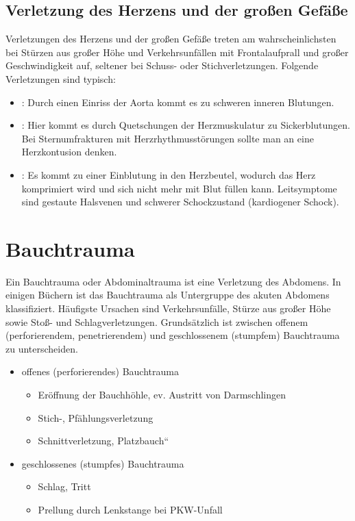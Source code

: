 \subsection{Verletzung des Herzens und der großen Gefäße}
Verletzungen des Herzens und der großen Gefäße treten am wahrscheinlichsten bei Stürzen aus großer Höhe und Verkehrsunfällen mit Frontalaufprall und großer Geschwindigkeit auf, seltener bei Schuss- oder Stichverletzungen. Folgende Verletzungen sind typisch:
\begin{itemize}
	\item {}: Durch einen Einriss der Aorta kommt es zu schweren inneren Blutungen.
	\item {}: Hier kommt es durch Quetschungen der Herzmuskulatur zu Sickerblutungen. Bei Sternumfrakturen mit Herzrhythmusstörungen sollte man an eine Herzkontusion denken.
	\item {}: Es kommt zu einer Einblutung in den Herzbeutel, wodurch das Herz komprimiert wird und sich nicht mehr mit Blut füllen kann. Leitsymptome sind gestaute Halsvenen und schwerer Schockzustand (kardiogener Schock).
\end{itemize}

\section{Bauchtrauma}

Ein Bauchtrauma oder Abdominaltrauma ist eine Verletzung des Abdomens. In einigen Büchern ist das Bauchtrauma als Untergruppe des akuten Abdomens klassifiziert. Häufigste Ursachen sind Verkehrsunfälle, Stürze aus großer Höhe sowie Stoß- und Schlagverletzungen. \cite{RedelsteinerHRNS1} Grundsätzlich ist zwischen offenem (perforierendem, penetrierendem) und geschlossenem (stumpfem) Bauchtrauma zu unterscheiden.

\begin{itemize}
    \item offenes (perforierendes) Bauchtrauma
    \begin{itemize}
        \item  Er\"offnung der Bauchh\"ohle, ev. Austritt von Darmschlingen
        \item Stich-, Pf\"ahlungsverletzung
        \item Schnittverletzung, {\quotedblbase}Platzbauch{\textquotedblleft}
    \end{itemize}
    \item geschlossenes (stumpfes) Bauchtrauma
    \begin{itemize}
        \item Schlag, Tritt
        \item Prellung durch Lenkstange bei PKW-Unfall
    \end{itemize}
\end{itemize}

